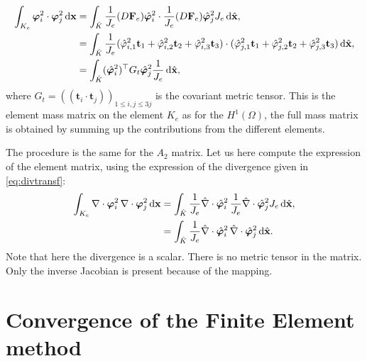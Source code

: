 \begin{align*}
   \int_{K_e} \boldsymbol{\varphi}^2_i\cdot \boldsymbol{\varphi}^2_j \,{\rm d} \mathbf{x} &=
 \int_{\hat{K}}  \frac{1}{J_e}(D \mathbf{F}_e)\hat{\boldsymbol{\varphi}}^2_i\cdot  \frac{1}{J_e}(D \mathbf{F}_e) \hat{\boldsymbol{\varphi}}^2_j J_e\,{\rm d} \hat{\mathbf{x}}, \\
 &= \int_{\hat{K}} \frac{1}{J_e} ( \hat{\varphi}^2_{i,1} \mathbf{t}_1 +\hat{\varphi}^2_{i,2} \mathbf{t}_2 +\hat{\varphi}^2_{i,3} \mathbf{t}_3 )
 \cdot ( \hat{\varphi}^2_{j,1} \mathbf{t}_1 +\hat{\varphi}^2_{j,2} \mathbf{t}_2 +\hat{\varphi}^2_{j,3} \mathbf{t}_3 ) \,{\rm d} \hat{\mathbf{x}},\\
 &=  \int_{\hat{K}} (\hat{\boldsymbol{\varphi}}^2_i)^\top G_t \hat{\boldsymbol{\varphi}}^2_j \frac{1}{J_e}\,{\rm d} \hat{\mathbf{x}},
 \end{align*}
 where $G_t= (( \mathbf{t}_i\cdot \mathbf{t}_j))_{1\leq i,j\leq 3j}$ is the covariant metric tensor. This is the element mass matrix on the element $K_e$ as for the $ H^1(\Omega)$, the full mass matrix is obtained by summing up the contributions from the different elements.

The procedure is the same for the $A_2$ matrix. Let us here  compute the expression of the element matrix, using the expression of the divergence given in \eqref{eq:divtransf}:
 \begin{align*}
   \int_{K_e} \nabla\cdot\boldsymbol{\varphi}^2_i\, \nabla\cdot\boldsymbol{\varphi}^2_j \,{\rm d} \mathbf{x} &=
 \int_{\hat{K}} \frac{1}{J_e}\hat{\nabla}\cdot\hat{\boldsymbol{\varphi}}^2_i\, \frac{1}{J_e}\hat{\nabla}\cdot \hat{\boldsymbol{\varphi}}^2_j J_e\,{\rm d} \hat{\mathbf{x}}, \\
 &=  \int_{\hat{K}} \frac{1}{J_e}\hat{\nabla}\cdot\hat{\boldsymbol{\varphi}}^2_i\, \hat{\nabla}\cdot \hat{\boldsymbol{\varphi}}^2_j \,{\rm d} \hat{\mathbf{x}}.
 \end{align*}
Note that here the divergence is a scalar. There is no metric tensor in the matrix. Only the inverse Jacobian is present because of  the mapping.


\section{Convergence of the Finite Element method}


